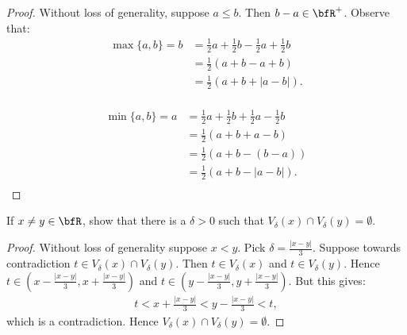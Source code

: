 \documentclass[10pt,twoside,openany]{memoir}
\begin{document}
        \begin{proof}
          Without loss of generality, suppose $a \leq b$. Then $b - a \in \bfR^+$. Observe that:
            \begin{equation*}
            \begin{split}
                \max{\{a,b\}} = b &= \frac{1}{2}a + \frac{1}{2}b - \frac{1}{2}a +  \frac{1}{2}b \\
                & =\frac{1}{2}(a + b - a + b) \\
                & = \frac{1}{2}(a + b  + |a-b|). \\
            \end{split}
            \end{equation*}  

            \begin{equation*}
            \begin{split}
                \min{\{a,b\}} = a &= \frac{1}{2}a + \frac{1}{2}b + \frac{1}{2}a -  \frac{1}{2}b \\
                & = \frac{1}{2}(a+b+a-b) \\
                & = \frac{1}{2}(a+b-(b-a))\\
                & = \frac{1}{2}(a+b-|a-b|).\\
            \end{split}
            \end{equation*}
        \end{proof}
    \begin{exercise}
        If $x\neq y \in \bfR$, show that there is a $\delta > 0$ such that $V_\delta(x) \cap V_\delta(y) = \emptyset$.
    \end{exercise}
        \begin{proof}
            Without loss of generality suppose $x < y$. Pick $\delta = \frac{|x-y|}{3}$. Suppose towards contradiction $t \in V_\delta(x) \cap V_\delta(y)$. Then $t \in V_\delta(x)$ and $t \in V_\delta(y)$. Hence $t \in (x- \frac{|x-y|}{3}, x + \frac{|x-y|}{3})$ and $t \in (y - \frac{|x-y|}{3}, y + \frac{|x-y|}{3})$. But this gives:
                \begin{equation*}
                \begin{split}
                    t < x+ \frac{|x-y|}{3} < y - \frac{|x-y|}{3} < t,
                \end{split}
                \end{equation*}
            which is a contradiction. Hence $V_\delta(x) \cap V_\delta(y) = \emptyset$.
        \end{proof}
\end{document}
